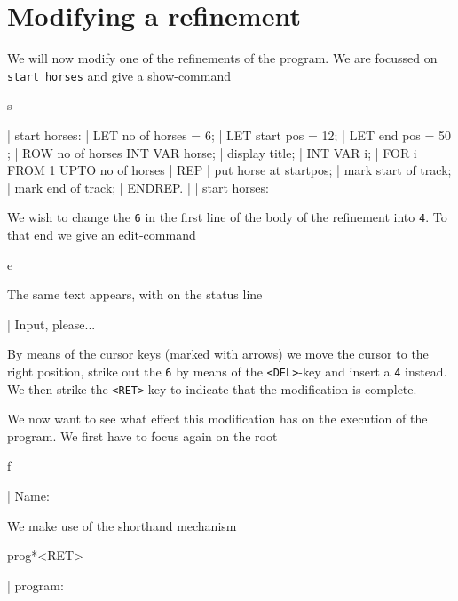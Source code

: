 \section{Modifying a refinement}

We will now modify one of the refinements of the program. We
are focussed on {\tt start horses} and give a show-command

\begin{elan}
        s

|       start horses:
|         LET no of horses = 6;
|         LET start pos = 12;
|         LET end pos = 50 ;
|         ROW no of horses INT VAR horse;
|         display title;
|         INT VAR i;
|         FOR i FROM 1 UPTO no of horses
|         REP
|           put horse at startpos;
|           mark start of track;
|           mark end of track;
|         ENDREP.
|
|       start horses:\cursor
\end{elan}

\noindent
We wish to change the {\tt 6} in the first line of the body of
the refinement into {\tt 4}. To that end we give an edit-command

\begin{elan}
        e
\end{elan}

\noindent
The same text appears, with on the status line

\begin{elan}
|                               Input, please...
\end{elan}

\noindent
By means of the cursor keys (marked with arrows) we move the cursor
to the right position, strike out the {\tt 6} by means of the
{\tt <DEL>}-key and insert a {\tt 4} instead. We then strike the {\tt <RET>}-key
to indicate that the modification is complete.

We now want to see what effect this modification has on the execution
of the program. We first have to focus again on the root

\begin{elan}
        f

|       Name:\cursor
\end{elan}

\noindent
We make use of the shorthand mechanism

\begin{elan}
        prog*<RET>

|       program:\cursor
\end{elan}

